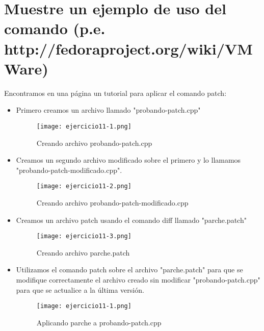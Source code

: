 	\section{Muestre un ejemplo de uso del comando (p.e. http://fedoraproject.org/wiki/VMWare)}
	
	Encontramos en una página un tutorial para aplicar el comando patch\cite{ejercicio11-1}:
	
	\begin{itemize}
		\item Primero creamos un archivo llamado "probando-patch.cpp"
		\begin{figure}[H]	
			\centering
			\texttt{[image: ejercicio11-1.png]} 
			\label{figura83} 
			\caption{Creando archivo probando-patch.cpp}
		\end{figure}
		\item Creamos un segundo archivo modificado sobre el primero y lo llamamos "probando-patch-modificado.cpp".
		\begin{figure}[H]	
			\centering
			\texttt{[image: ejercicio11-2.png]} 
			\label{figura84} 
			\caption{Creando archivo probando-patch-modificado.cpp}
		\end{figure}
		\item Creamos un archivo patch usando el comando diff\cite{ejercicio11-2} llamado "parche.patch"
		\begin{figure}[H]	
			\centering
			\texttt{[image: ejercicio11-3.png]} 
			\label{figura85} 
			\caption{Creando archivo parche.patch}
		\end{figure}
		\item Utilizamos el comando patch\cite{ejercicio11-3} sobre el archivo "parche.patch" para que se modifique correctamente el archivo creado sin modificar "probando-patch.cpp" para que se actualice a la última versión.
		\begin{figure}[H]	
			\centering
			\texttt{[image: ejercicio11-1.png]} 
			\label{figura86} 
			\caption{Aplicando parche a probando-patch.cpp}
		\end{figure}
	\end{itemize}
	
	
	
